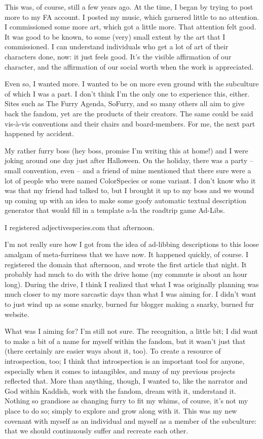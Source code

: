 This was, of course, still a few years ago.  At the time, I began by trying to post more to my FA account.  I posted my music, which garnered little to no attention.  I commissioned some more art, which got a little more.  That attention felt good.  It was good to be known, to some (very) small extent by the art that I commissioned.  I can understand individuals who get a lot of art of their characters done, now: it just feels good.  It's the visible affirmation of our character, and the affirmation of our social worth when the work is appreciated.

Even so, I wanted more.  I wanted to be on more even ground with the subculture of which I was a part.  I don't think I'm the only one to experience this, either.  Sites such as The Furry Agenda, SoFurry, and so many others all aim to give back the fandom, yet are the products of their creators.  The same could be said vis-à-vis conventions and their chairs and board-members.  For me, the next part happened by accident.

My rather furry boss (hey boss, promise I'm writing this at home!) and I were joking around one day just after Halloween.  On the holiday, there was a party -- small convention, even -- and a friend of mine mentioned that there sure were a lot of people who were named ColorSpecies or some variant.  I don't know who it was that my friend had talked to, but I brought it up to my boss and we wound up coming up with an idea to make some goofy automatic textual description generator that would fill in a template a-la the roadtrip game Ad-Libs.

I registered adjectivespecies.com that afternoon.

I'm not really sure how I got from the idea of ad-libbing descriptions to this loose amalgam of meta-furriness that we have now.  It happened quickly, of course.  I registered the domain that afternoon, and wrote the first article that night.  It probably had much to do with the drive home (my commute is about an hour long).  During the drive, I think I realized that what I was originally planning was much closer to my more sarcastic days than what I was aiming for.  I didn't want to just wind up as some snarky, burned fur blogger making a snarky, burned fur website.

What was I aiming for?  I'm still not sure.  The recognition, a little bit; I did want to make a bit of a name for myself within the fandom, but it wasn't just that (there certainly are easier ways about it, too).  To create a resource of introspection, too; I think that introspection is an important tool for anyone, especially when it comes to intangibles, and many of my previous projects reflected that.  More than anything, though, I wanted to, like the narrator and God within Kaddish, work with the fandom, dream with it, understand it.  Nothing so grandiose as changing furry to fit my whims, of course, it's not my place to do so; simply to explore and grow along with it.  This was my new covenant with myself as an individual and myself as a member of the subculture: that we should continuously suffer and recreate each other.
